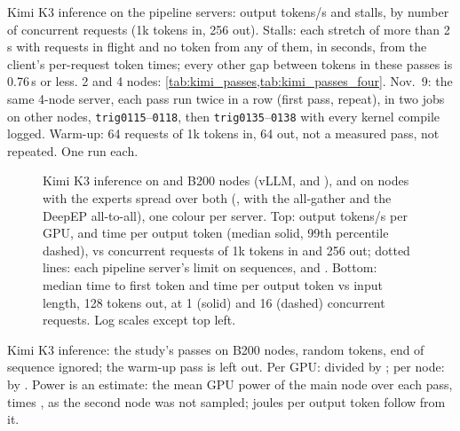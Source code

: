 \begin{table}[h]
  \caption{Kimi K3 inference on the pipeline servers: output tokens/s and stalls, by number of concurrent requests (1k tokens in, 256 out). Stalls: each stretch of more than 2\,s with requests in flight and no token from any of them, in seconds, from the client's per-request token times; every other gap between tokens in these passes is 0.76\,s or less. 2 and 4 nodes: \cref{tab:kimi_passes,tab:kimi_passes_four}. Nov.~9: the same 4-node server, each pass run twice in a row (first pass, repeat), in two jobs on other nodes, \texttt{trig0115}--\texttt{0118}, then \texttt{trig0135}--\texttt{0138} with every kernel compile logged. Warm-up: 64 requests of 1k tokens in, 64 out, not a measured pass, not repeated. One run each.}
  \label{tab:kimi_stall}
  \centering\small
  \begin{adjustbox}{max width=\linewidth}
  \end{adjustbox}
\end{table}

\begin{figure}[h]
  \centering{}
  \caption{Kimi K3 inference on \TriKimiNodes{} and \TriKimiFourNodes{} B200 nodes (vLLM, \TriKimiLayout{} and \TriKimiFourLayout), and on \TriKxnNodes{} nodes with the experts spread over both (\TriKxnLayout, with the all-gather and the DeepEP all-to-all), one colour per server. Top: output tokens/s per GPU, and time per output token (median solid, 99th percentile dashed), vs concurrent requests of 1k tokens in and 256 out; dotted lines: each pipeline server's limit on sequences, \TriKimiMaxSeqs{} and \TriKimiFourMaxSeqs. Bottom: median time to first token and time per output token vs input length, 128 tokens out, at 1 (solid) and 16 (dashed) concurrent requests. Log scales except top left.}
  \label{fig:kimi_inference}
\end{figure}

\begin{table}[h]
  \caption{Kimi K3 inference: the study's passes on \TriKimiNodes{} B200 nodes, random tokens, end of sequence ignored; the warm-up pass is left out. Per GPU: divided by \TriKimiGpus; per node: by \TriKimiNodes. Power is an estimate: the mean GPU power of the main node over each pass, times \TriKimiNodes, as the second node was not sampled; joules per output token follow from it.}
  \label{tab:kimi_passes}
  \centering\scriptsize
  \begin{adjustbox}{max width=\linewidth}
  \end{adjustbox}
\end{table}

